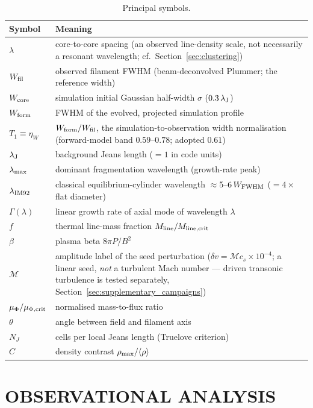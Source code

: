 \documentclass[usenatbib,twoside,twocolumn]{mnras}
\begin{document}
\begin{table}
\caption{Principal symbols.}
\label{tab:symbols}
\footnotesize
\setlength{\tabcolsep}{4pt}
\begin{tabular}{lp{6.1cm}}
\toprule
Symbol & Meaning \\
\midrule
$\lambda$ & core-to-core spacing (an observed line-density scale, not necessarily a resonant wavelength; cf.\ Section~\ref{sec:clustering}) \\
$W_{\rm fil}$ & observed filament FWHM (beam-deconvolved Plummer; the reference width) \\
$W_{\rm core}$ & simulation initial Gaussian half-width $\sigma$ ($0.3\,\lambda_{\rm J}$) \\
$W_{\rm form}$ & FWHM of the evolved, projected simulation profile \\
$T_1\!\equiv\!\eta_W$ & $W_{\rm form}/W_{\rm fil}$, the simulation-to-observation width normalisation (forward-model band $0.59$--$0.78$; adopted $0.61$) \\
$\lambda_{\rm J}$ & background Jeans length ($=1$ in code units) \\
$\lambda_{\rm max}$ & dominant fragmentation wavelength (growth-rate peak) \\
$\lambda_{\rm IM92}$ & classical equilibrium-cylinder wavelength $\approx5$--$6\,W_{\rm FWHM}$ ($=4\times$ flat diameter) \\
$\Gamma(\lambda)$ & linear growth rate of axial mode of wavelength $\lambda$ \\
$f$ & thermal line-mass fraction $M_{\rm line}/M_{\rm line,crit}$ \\
$\beta$ & plasma beta $8\pi P/B^2$ \\
$\mathcal{M}$ & amplitude label of the seed perturbation ($\delta v=\mathcal{M}c_s\times10^{-4}$; a linear seed, \emph{not} a turbulent Mach number --- driven transonic turbulence is tested separately, Section~\ref{sec:supplementary_campaigns}) \\
$\mu_\Phi/\mu_{\Phi,\rm crit}$ & normalised mass-to-flux ratio \\
$\theta$ & angle between field and filament axis \\
$N_J$ & cells per local Jeans length (Truelove criterion) \\
$C$ & density contrast $\rho_{\rm max}/\langle\rho\rangle$ \\
\bottomrule
\end{tabular}
\end{table}

\section{OBSERVATIONAL ANALYSIS}
\end{document}
